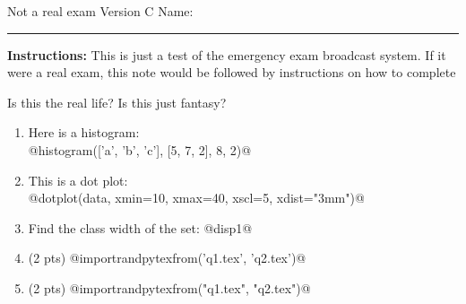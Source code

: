 \documentclass[12pt]{article}
\newcommand{\version}{C}
\begin{document}
\pagestyle{empty}

\noindent Not a real exam Version {\version} \hfill Name: \rule{6cm}{0.15mm} \vspace{2mm}

\begin{instructionbox}
    \textbf{Instructions:} This is just a test of the emergency exam broadcast system.
    If it were a real exam, this note would be followed by instructions on how to complete
\end{instructionbox}

Is this the real life?
Is this just fantasy?

\begin{enumerate}

\item Here is a histogram: \\[4mm]
  @histogram(['a', 'b', 'c'], [5, 7, 2], 8, 2)@


\item This is a dot plot: \\[4mm]

@dotplot(data, xmin=10, xmax=40, xscl=5, xdist="3mm")@

%
%
%

\item Find the class width of the set: @disp1@ \\[4cm]


\item (2 pts) @importrandpytexfrom('q1.tex', 'q2.tex')@

\item (2 pts) @importrandpytexfrom("q1.tex", "q2.tex")@



\vspace{3cm}



\end{enumerate}
\end{document}

